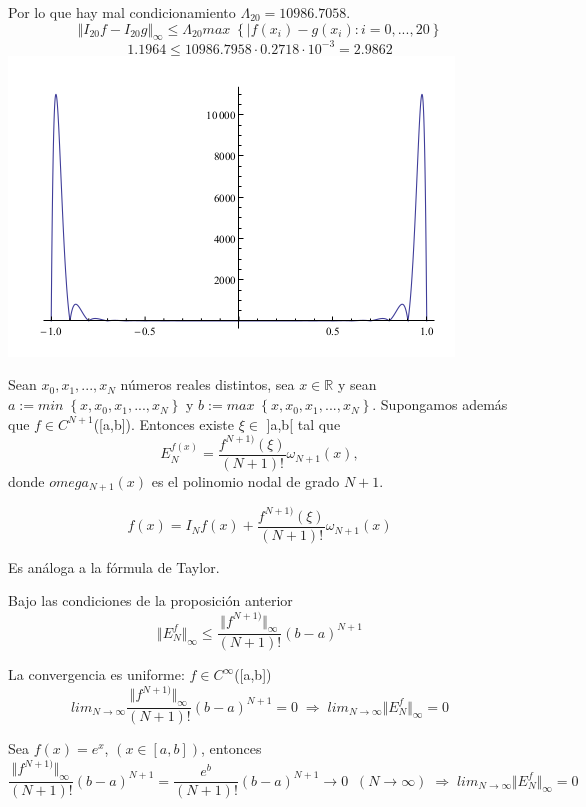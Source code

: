 \begin{ejemplo}
Por lo que hay mal condicionamiento $\Lambda _{20} = 10986.7058$.
\[ \Vert I_{20}f-I_{20}g \Vert _\infty \leq \Lambda _{20} max \; \left\lbrace \vert f(x_i)-g(x_i) : i=0,...,20 \right\rbrace \]
\[ 1.1964 \leq 10986.7958 \cdot 0.2718 \cdot 10^{-3} = 2.9862 \]
\includegraphics[scale=0.3]{media/ej1-5_t2_.png}
\end{ejemplo}

\begin{nprop}
Sean $x_0,x_1,...,x_N$ números reales distintos, sea $x \in \mathbb{R}$ y sean $a:=min \; \left\lbrace x,x_0,x_1,...,x_N \right\rbrace$ y $b:=max \; \left\lbrace x,x_0,x_1,...,x_N \right\rbrace$. Supongamos además que $f \in C^{N+1}$([a,b]). Entonces existe $\xi \in$ ]a,b[ tal que
\[ E_N^{f(x)}=\frac{f^{N+1)}( \xi )}{(N+1)!} \omega _{N+1}(x), \]
donde $omega _{N+1}(x)$ es el polinomio nodal de grado $N+1$.
\end{nprop}

\[ f(x) = I_Nf(x) + \frac{f^{N+1)}( \xi )}{(N+1)!} \omega _{N+1}(x) \]

Es análoga a la fórmula de Taylor.

\begin{ncor}
Bajo las condiciones de la proposición anterior
\[ \Vert E_N^f \Vert _\infty \leq \frac{\Vert f^{N+1)} \Vert _\infty }{(N+1)!} (b-a)^{N+1} \]
\end{ncor}

La convergencia es uniforme: $f \in C^{\infty}$([a,b])
\[ lim_{N \rightarrow \infty} \frac{\Vert f^{N+1)} \Vert _\infty }{(N+1)!} (b-a)^{N+1} = 0 \; \Rightarrow \; lim_{N \rightarrow \infty} \Vert E_N^f \Vert _\infty = 0 \]

\begin{ejemplo}
Sea $f(x) = e^x$, $(x \in \left[ a,b \right] )$, entonces
\[ \frac{\Vert f^{N+1)} \Vert _\infty}{(N+1)!} (b-a)^{N+1} = \frac{e^b}{(N+1)!} (b-a)^{N+1} \rightarrow 0 \; \; (N \rightarrow \infty) \; \Rightarrow \; lim_{N\rightarrow \infty} \Vert E_N^f \Vert _\infty = 0 \]
\end{ejemplo}

